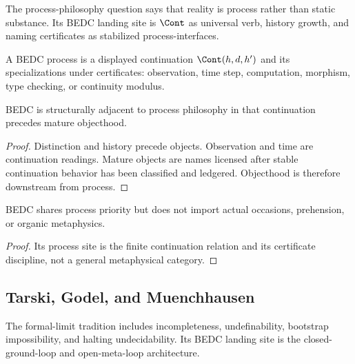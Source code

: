 \begin{definition}
\label{def:philosophy-process-question}
The process-philosophy question says that reality is process rather
than static substance. Its BEDC landing site is \(\Cont\) as universal
verb, history growth, and naming certificates as stabilized
process-interfaces.
\end{definition}

\begin{definition}
\label{def:philosophy-bedc-process}
A BEDC process is a displayed continuation \(\Cont(h,d,h')\) and its
specializations under certificates: observation, time step,
computation, morphism, type checking, or continuity modulus.
\end{definition}

\begin{theorem}
\label{thm:philosophy-bedc-certificate-process-theory}
BEDC is structurally adjacent to process philosophy in that continuation
precedes mature objecthood.
\end{theorem}
\begin{proof}
Distinction and history precede objects. Observation and time are
continuation readings. Mature objects are names licensed after stable
continuation behavior has been classified and ledgered. Objecthood is
therefore downstream from process.
\end{proof}

\begin{corollary}
\label{cor:philosophy-bedc-not-whiteheadian}
BEDC shares process priority but does not import actual occasions,
prehension, or organic metaphysics.
\end{corollary}
\begin{proof}
Its process site is the finite continuation relation and its
certificate discipline, not a general metaphysical category.
\end{proof}

\subsection{Tarski, Godel, and Muenchhausen}
\label{subsec:philosophy-formal-limit-tradition}

\begin{definition}
\label{def:philosophy-formal-limit-tradition}
The formal-limit tradition includes incompleteness, undefinability,
bootstrap impossibility, and halting undecidability. Its BEDC landing
site is the closed-ground-loop and open-meta-loop architecture.
\end{definition}

